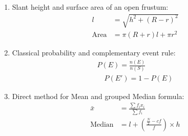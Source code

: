\begin{enumerate}[label=\thesubsection.\arabic*, ref=\thesubsection.\theenumi]
    \item Slant height and surface area of an open frustum:
\begin{align}
    l &= \sqrt{h^2 + (R - r)^2} \label{eq:EE26BTECH11225-frustum-l} \\
    \text{Area} &= \pi(R + r)l + \pi r^2 \label{eq:EE26BTECH11225-frustum-area}
\end{align}

    \item Classical probability and complementary event rule:
\begin{align}
    P(E) = \frac{n(E)}{n(S)} \label{eq:EE26BTECH11225-prob} \\
    \quad P(E') = 1 - P(E) \label{eq:EE26BTECH11225-prob-comp}
\end{align}

    \item Direct method for Mean and grouped Median formula:
\begin{align}
    \bar{x} &= \frac{\sum f_i x_i}{\sum f_i} \label{eq:EE26BTECH11225-mean} \\
    \text{Median} &= l + \left(\frac{\frac{N}{2} - cf}{f}\right) \times h \label{eq:EE26BTECH11225-median}
\end{align}
\end{enumerate}
